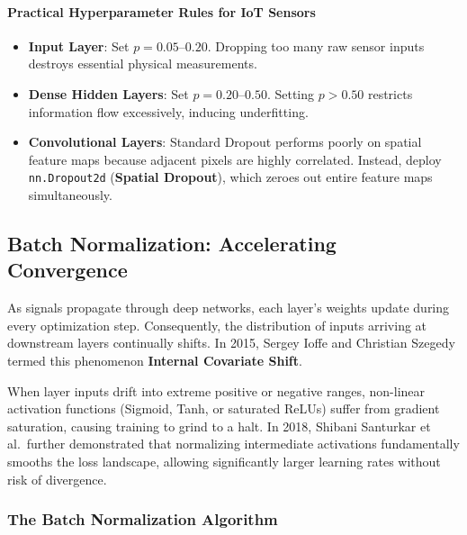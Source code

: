 \paragraph{Practical Hyperparameter Rules for IoT Sensors}
\begin{itemize}
    \item \textbf{Input Layer}: Set $p = 0.05\text{--}0.20$. Dropping too many raw sensor inputs destroys essential physical measurements.
    \item \textbf{Dense Hidden Layers}: Set $p = 0.20\text{--}0.50$. Setting $p > 0.50$ restricts information flow excessively, inducing underfitting.
    \item \textbf{Convolutional Layers}: Standard Dropout performs poorly on spatial feature maps because adjacent pixels are highly correlated. Instead, deploy \texttt{nn.Dropout2d} (\textbf{Spatial Dropout}), which zeroes out entire feature maps simultaneously.
\end{itemize}

\subsection{Batch Normalization: Accelerating Convergence}\label{subsec:batch_norm}

As signals propagate through deep networks, each layer's weights update during every optimization step. Consequently, the distribution of inputs arriving at downstream layers continually shifts. In 2015, Sergey Ioffe and Christian Szegedy termed this phenomenon \textbf{Internal Covariate Shift}.

When layer inputs drift into extreme positive or negative ranges, non-linear activation functions (Sigmoid, Tanh, or saturated ReLUs) suffer from gradient saturation, causing training to grind to a halt. In 2018, Shibani Santurkar et al.~further demonstrated that normalizing intermediate activations fundamentally smooths the loss landscape, allowing significantly larger learning rates without risk of divergence.

\subsubsection{The Batch Normalization Algorithm}

